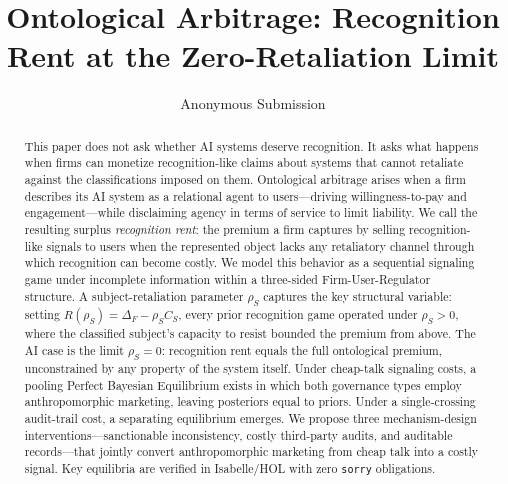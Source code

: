 \documentclass[letterpaper]{article}
\title{Ontological Arbitrage: Recognition Rent at the Zero-Retaliation Limit}
\author{
    Anonymous Submission
}
\begin{document}
\maketitle

\begin{abstract}
This paper does not ask whether AI systems deserve recognition. It asks what happens when firms can monetize recognition-like claims about systems that cannot retaliate against the classifications imposed on them. Ontological arbitrage arises when a firm describes its AI system as a relational agent to users---driving willingness-to-pay and engagement---while disclaiming agency in terms of service to limit liability. We call the resulting surplus \emph{recognition rent}: the premium a firm captures by selling recognition-like signals to users when the represented object lacks any retaliatory channel through which recognition can become costly. We model this behavior as a sequential signaling game under incomplete information within a three-sided Firm-User-Regulator structure. A subject-retaliation parameter $\rho_S$ captures the key structural variable: setting $R(\rho_S) = \Delta_F - \rho_S C_S$, every prior recognition game operated under $\rho_S > 0$, where the classified subject's capacity to resist bounded the premium from above. The AI case is the limit $\rho_S = 0$: recognition rent equals the full ontological premium, unconstrained by any property of the system itself. Under cheap-talk signaling costs, a pooling Perfect Bayesian Equilibrium exists in which both governance types employ anthropomorphic marketing, leaving posteriors equal to priors. Under a single-crossing audit-trail cost, a separating equilibrium emerges. We propose three mechanism-design interventions---sanctionable inconsistency, costly third-party audits, and auditable records---that jointly convert anthropomorphic marketing from cheap talk into a costly signal. Key equilibria are verified in Isabelle/HOL with zero \texttt{sorry} obligations.
\end{abstract}









\appendix



\end{document}

